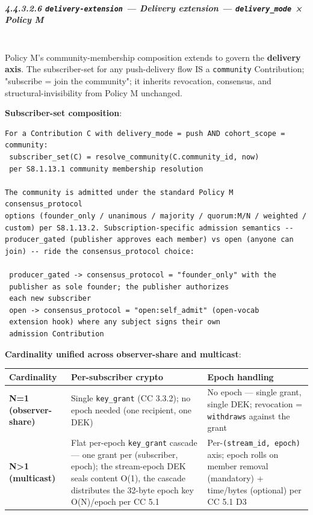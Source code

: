 \documentclass[11pt]{article}
\begin{document}
\subparagraph{4.4.3.2.6 \texttt{delivery-extension} — Delivery extension — \texttt{delivery\_mode} × Policy M}\mbox{}\\


Policy M's community-membership composition extends to govern the \textbf{delivery axis}. The subscriber-set for any push-delivery flow IS a \texttt{community} Contribution; "subscribe = join the community"; it inherits revocation, consensus, and structural-invisibility from Policy M unchanged.


\textbf{Subscriber-set composition}:


\begin{lstlisting}
For a Contribution C with delivery_mode = push AND cohort_scope = community:
 subscriber_set(C) = resolve_community(C.community_id, now)
 per S8.1.13.1 community membership resolution

The community is admitted under the standard Policy M consensus_protocol
options (founder_only / unanimous / majority / quorum:M/N / weighted /
custom) per S8.1.13.2. Subscription-specific admission semantics --
producer_gated (publisher approves each member) vs open (anyone can
join) -- ride the consensus_protocol choice:

 producer_gated -> consensus_protocol = "founder_only" with the
 publisher as sole founder; the publisher authorizes
 each new subscriber
 open -> consensus_protocol = "open:self_admit" (open-vocab
 extension hook) where any subject signs their own
 admission Contribution
\end{lstlisting}

\textbf{Cardinality unified across observer-share and multicast}:


{\footnotesize
\begin{longtable}{|p{5.33cm}|p{5.33cm}|p{5.33cm}|}\hline
\textbf{Cardinality} & \textbf{Per-subscriber crypto} & \textbf{Epoch handling} \\ \hline\endhead
\textbf{N=1 (observer-share)} & Single \texttt{key\_grant} (CC 3.3.2); no epoch needed (one recipient, one DEK) & No epoch — single grant, single DEK; revocation = \texttt{withdraws} against the grant \\ \hline
\textbf{N>1 (multicast)} & Flat per-epoch \texttt{key\_grant} cascade — one grant per (subscriber, epoch); the stream-epoch DEK seals content O(1), the cascade distributes the 32-byte epoch key O(N)/epoch per CC 5.1 & Per-\texttt{(stream\_id, epoch)} axis; epoch rolls on member removal (mandatory) + time/bytes (optional) per CC 5.1 D3 \\ \hline
\end{longtable}}
\end{document}
